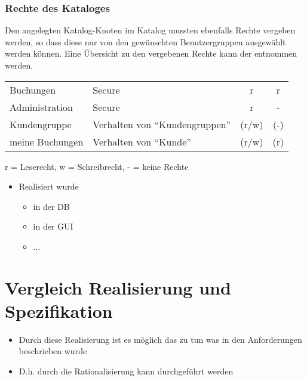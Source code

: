 \subsubsection{Rechte des Kataloges}
Den angelegten Katalog-Knoten im Katalog mussten ebenfalls Rechte vergeben werden, so dass diese nur von den gewünschten Benutzergruppen ausgewählt werden können.
Eine Übersicht zu den vergebenen Rechte kann der  entnommen werden.

\begin{minipage}{\linewidth}
\centering
{} \label{tab:katalogrechte}
\begin{tabulary}{\textwidth}{|l|L|C|c|}
 \hline 
  &  &  &  \tabularnewline
 \hline 
 Buchungen & Secure & r & r \\ 
 \hline 
 Administration & Secure &r & - \\ 
 \hline 
 Kundengruppe & Verhalten von "`Kundengruppen"' & (r/w) & (-) \\ 
 \hline 
 meine Buchungen & Verhalten von "`Kunde"' & (r/w) & (r) \\ 
 \hline 
 \end{tabulary}
 \par
 \bigskip
 r = Leserecht, w = Schreibrecht, - = keine Rechte
 \end{minipage}


\begin{itemize}
	\item Realisiert wurde
	\begin{itemize}
		\item in der DB
		\item in der GUI
		\item ...
	\end{itemize}
\end{itemize}


\section{Vergleich Realisierung und Spezifikation}
\begin{itemize}
	\item Durch diese Realisierung ist es möglich das zu tun was in den Anforderungen beschrieben wurde
	\item D.h. durch die Rationalisierung kann durchgeführt werden
\end{itemize}